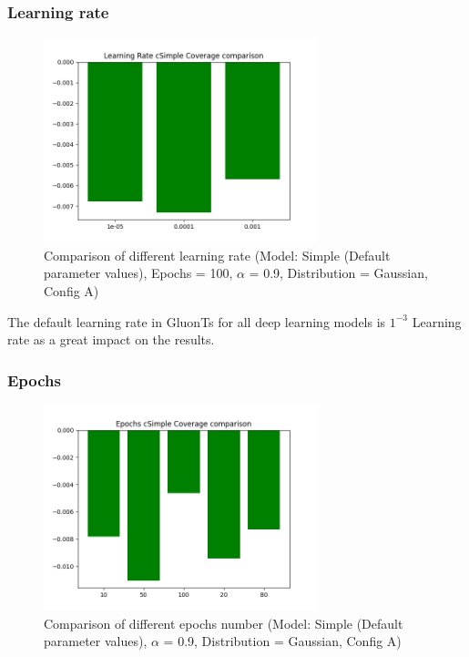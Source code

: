 \subsubsection{Learning rate} \label{comp2_lr}

\begin{figure}[H]
    \centering
    \includegraphics[width=300px]{plots/hist/a/lr/cSimple/Coverage.png}
    \caption{Comparison of different learning rate (Model: Simple (Default parameter values), Epochs = 100, $\alpha$ = 0.9, Distribution = Gaussian, Config A)}
    \label{fig:comp2_lr}
\end{figure}

The default learning rate in GluonTs for all deep learning models is $1^{-3}$
Learning rate as a great impact on the results.

\subsubsection{Epochs} \label{comp2_epochs}

\begin{figure}[H]
    \centering
    \includegraphics[width=300px]{plots/hist/a/epochs/cSimple/Coverage.png}
    \caption{Comparison of different epochs number (Model: Simple (Default parameter values), $\alpha$ = 0.9, Distribution = Gaussian, Config A)}
    \label{fig:comp2_epochs}
\end{figure}

